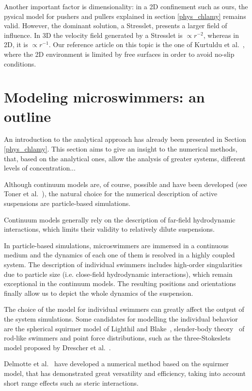 Another important factor is dimensionality: in a 2D confinement such as ours, the pysical model for pushers and pullers explained in section \ref{phys_chlamy} remains valid. However, the dominant solution, a Stresslet, presents a larger field of influence. In 3D the velocity field generated by a Stresslet is $\propto r^{-2}$, whereas in 2D, it is $\propto r^{-1}$. Our reference article on this topic is the one of Kurtuldu et al.~\cite{Kurtuldu2011}, where the 2D environment is limited by free surfaces in order to avoid no-slip conditions. 

\section{Modeling microswimmers: an outline}
\label{SOA_modeling}

An introduction to the analytical approach has already been presented in Section \ref{phys_chlamy}. This section aims to give an insight to the numerical methods, that, based on the analytical ones, allow the analysis of greater systems, different levels of concentration...

Although continuum models are, of course, possible and have been developed (see Toner et al.~\cite{Toner}), the natural choice for the numerical description of active suspensions are particle-based simulations.

Continuum models generally rely on the description of far-field hydrodynamic interactions, which limits their validity to relatively dilute suspensions.

In particle-based simulations, microswimmers are immersed in a continuous medium and the dynamics of each one of them is resolved in a highly coupled system. The description of individual swimmers includes high-order singularities due to particle size (i.e. close-field hydrodynamic interactions), which remain exceptional in the continuum models. The resulting positions and orientations finally allow us to depict the whole dynamics of the suspension.

The choice of the model for individual swimmers can greatly affect the output of the system simulations. Some candidates for modelling the individual behavior are the spherical squirmer model of Lighthil and Blake~\cite{Blake}, slender-body theory~\cite{batchelor_1970} of rod-like swimmers and point force distributions, such as the three-Stokeslets model proposed by Drescher et al.~\cite{Drescher2010}.

Delmotte et al.~\cite{Delmotte2015} have developed a numerical method based on the squirmer model, that has demonstrated great versatility and efficiency, taking into account short range effects such as steric interactions. 

